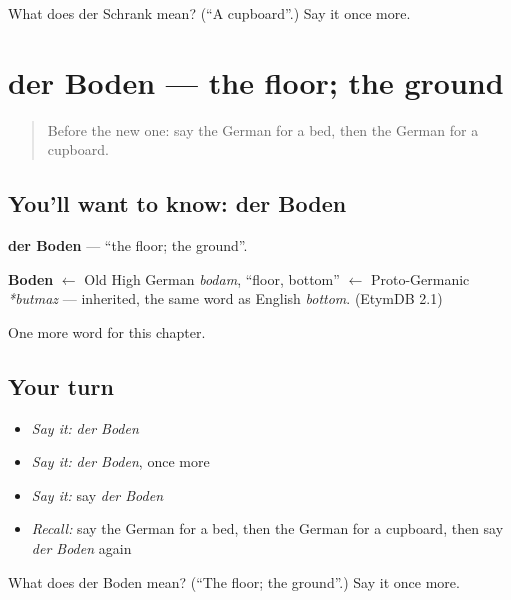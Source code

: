 \begin{tcolorbox}[breakable,colback=teal!4,colframe=teal!35!black,title={Before you move on}]
What does der Schrank mean? (\textquotedblleft{}A cupboard\textquotedblright{}.) Say it once more.
\end{tcolorbox}
\section[der Boden]{der Boden — the floor; the ground}

\label{lesson:GE-C78-boden}



\begin{quote}
Before the new one: say the German for a bed, then the German for a cupboard.
\end{quote}

\subsection*{You'll want to know: der Boden}
\textbf{der Boden} — \textquotedblleft{}the floor; the ground\textquotedblright{}.

\begin{cousinweb}
\textbf{Boden} $\leftarrow$ Old High German \emph{bodam}, \textquotedblleft{}floor, bottom\textquotedblright{} $\leftarrow$ Proto-Germanic \emph{*butmaz} — inherited, the same word as English \emph{bottom}. (EtymDB 2.1)
\end{cousinweb}

\begin{grammarlens}[title={What you've built}]
One more word for this chapter.
\end{grammarlens}

\subsection*{Your turn}
\begin{itemize}
\raggedright
  \item \emph{Say it:} \emph{der Boden}
  \item \emph{Say it:} \emph{der Boden}, once more
  \item \emph{Say it:} say \emph{der Boden}
  \item \emph{Recall:} say the German for a bed, then the German for a cupboard, then say \emph{der Boden} again
\end{itemize}

\begin{tcolorbox}[breakable,colback=teal!4,colframe=teal!35!black,title={Before you move on}]
What does der Boden mean? (\textquotedblleft{}The floor; the ground\textquotedblright{}.) Say it once more.
\end{tcolorbox}
